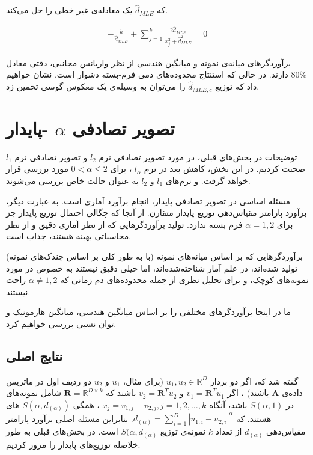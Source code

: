 \begin{itemize}
که 
$\hat{d}_{MLE}$
یک معادله‌ی غیر خطی 
را حل می‌کند.

\begin{align}
- \frac{k}{\hat{d}_{MLE}} + \sum_{j=1}^k \frac{2\hat{d}_{MLE}}{x_j^2 + \hat{d}_{MLE}^2 } = 0
\label{eq:1iV}
\end{align}

برآوردگرهای میانه‌ی نمونه و میانگین هندسی از نظر واریانس مجانبی، دقتی معادل 
$80\%$
دارند. در حالی که استنتاج محدوده‌های دمی فرم-بسته دشوار است. نشان‌ خواهیم داد که توزیع 
$\hat{d}_{MLE,c}$
را می‌توان به وسیله‌ی یک معکوس گوسی%
تخمین زد.

\end{itemize}



\section{
تصویر تصادفی 
$\alpha$
-پایدار
}
توضیحات
در بخش‌های قبلی، در مورد تصویر تصادفی نرم 
$l_2$
و تصویر تصادفی نرم
$l_1$
صحبت کردیم. در این بخش، کاهش بعد در نرم 
$l_\alpha$
، برای 
$0 < \alpha \leq 2$
مورد بررسی قرار خواهد گرفت. و نرم‌های 
$l_1$
و 
$l_2$
به عنوان حالت خاص بررسی می‌شوند.

مسئله اساسی در تصویر تصادفی پایدار، انجام برآورد آماری است. به عبارت دیگر، برآورد پارامتر مقیاس‌دهی توزیع پایدار متقارن. از آنجا که  چگالی احتمال توزیع پایدار جز برای 
$\alpha = 1, 2$
فرم بسته‌ ندارد. تولید برآوردگرهایی که از نظر آماری دقیق و از نظر محاسباتی بهینه هستند، جذاب است.

برآوردگرهایی که بر اساس میانه‌های نمونه (با به طور کلی بر اساس چندک‌های نمونه) تولید شده‌اند، در علم آمار شناخته‌شده‌اند، اما خیلی دقیق نیستند به خصوص در مورد نمونه‌های کوچک، و برای تحلیل نظری از جمله محدوده‌های دم زمانی که 
$\alpha \neq 1, 2$
راحت نیستند. 

ما در اینجا برآوردگر‌های مختلفی را بر اساس میانگین هندسی، میانگین هارمونیک
 و توان نسبی 
بررسی خواهیم کرد.


\subsection{
نتایج اصلی
}
گفته شد که، اگر دو بردار 
$u_1, u_2 \in \mathbb{R}^D$
(برای مثال،
$u_1$
و 
$u_2$
دو ردیف اول در ماتریس داده‌ی 
$\mathbf{A}$
باشند)
، اگر 
$v_1 = \mathbf{R}^T u_1$
و 
$v_2 = \mathbf{R}^T u_2$
باشند که 
$\mathbf{R} = \mathbb{R}^{D \times k}$
شامل نمونه‌های 
در 
$S(\alpha, 1)$
باشد، آنگاه 
$x_j = v_{1,j} - v_{2,j}, j = 1,2, \ldots, k$
، همگی
$S(\alpha, d_{(\alpha)})$
های 
هستند. که
$d_{(\alpha)} = \sum_{i=1}^D \left| u_{1,i} - u_{2,i} \right|^{\alpha}$.
بنابراین مسئله اصلی برآورد پارامتر مقیاس‌دهی 
$d_{(\alpha)}$
از تعداد 
$k$
نمونه‌ی 
توزیع
$S(\alpha, d_{(\alpha)}$
است. 
در بخش‌های قبلی به طور خلاصله توزیع‌های پایدار را مرور کردیم.

